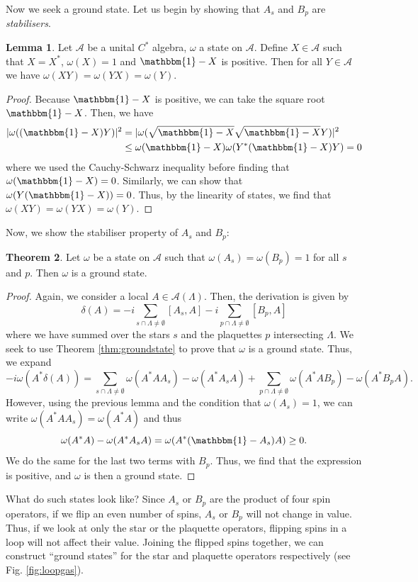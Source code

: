\documentclass[prb,11pt, nofootinbib]{revtex4-2}
\theoremstyle{definition}
\newtheorem{Theorem}{Theorem}
\newtheorem{Lemma}[Theorem]{Lemma}
\theoremstyle{definition}
\theoremstyle{definition}
\theoremstyle{definition}
\newcommand{\note}[1]{{\color{red} {#1}}}
\renewcommand{\note}[1]{{}}
\begin{document}
Now we seek a ground state. Let us begin by showing that $A_s$ and $B_p$ are \emph{stabilisers}.
\begin{Lemma}
	Let $\mathcal{A}$ be a unital $C^*$ algebra,  $\omega$ a state on $\mathcal{A}$. Define $X\in \mathcal{A}$ such that $X=X^*$, $\omega(X)=1$ and $\mathbbm{1}-X$ is positive. Then for all $Y\in \mathcal{A}$ we have $\omega(XY)=\omega(YX)=\omega(Y)$.
\end{Lemma}
\begin{proof}
	Because $\mathbbm{1}-X$ is positive, we can take the square root $\mathbbm{1}-X$. Then, we have
	\begin{align*}
		|\omega( (\mathbbm{1}-X)Y)|^2 &= |\omega(\sqrt{\mathbbm{1}-X}\sqrt{\mathbbm{1}-X}Y)|^2  \\ 
		&\le \omega(\mathbbm{1}-X)\omega(Y^* (\mathbbm{1}-X)Y)=0 
	\end{align*}
	\note{The last equality follows from linearity, and thus $\omega(\mathbbm{1}-X)=0$. Write down the fact that $\omega( (\mathbbm{1}-X)Y)=0$ }where we used the Cauchy-Schwarz inequality\note{ $|\omega(A^*B)|^2 \le \omega(A^*A)\omega(B^*B)$} before finding that $\omega(\mathbbm{1}-X)=0$. Similarly, we can show that $\omega(Y(\mathbbm{1}-X))=0$. Thus, by the linearity of states, we find that $\omega(XY)=\omega(YX)=\omega(Y)$. 
\end{proof}
Now, we show the stabiliser property of $A_s$ and $B_p$:
\begin{Theorem}
Let $\omega$ be a state on $\mathcal{A}$ such that $\omega(A_s)=\omega(B_p)=1$ for all $s$ and $p$. Then $\omega$ is a ground state.
\end{Theorem}
\begin{proof}
	Again, we consider a local $A\in \mathcal{A}(\Lambda)$. Then, the derivation is given by
	\[
	\delta(A) = -i \sum_{s\cap \Lambda \neq \emptyset} [A_s, A] - i \sum_{p\cap \Lambda\neq\emptyset} [B_p, A]
	\] 
	where we have summed over the stars $s$ and the plaquettes $p$ intersecting $\Lambda$. We seek to use Theorem \ref{thm:groundstate} to prove that $\omega$ is a ground state. Thus, we expand\note{ Note that $\mathbbm{1}-A_s$ is positive because $A_s$ is a projector}
	\[
	-i\omega(A^*\delta(A))=\sum_{s\cap\Lambda\neq\emptyset} \omega(A^*A A_s)-\omega(A^*A_sA)+\sum_{p\cap\Lambda\neq\emptyset}\omega(A^*AB_p)-\omega(A^*B_pA)
	.\] 
	However, using the previous lemma and the condition that $\omega(A_s)=1$, we can write $\omega(A^*A A_s)=\omega(A^* A)$ and thus
	\[
	\omega(A^*A)-\omega(A^* A_s A)=\omega(A^* (\mathbbm{1}-A_s)A)\ge 0
	.\] 
	We do the same for the last two terms with $B_p$. Thus, we find that the expression is positive, and $\omega$ is then a ground state.
\end{proof}
What do such states look like? Since $A_s$ or $B_p$ are the product of four spin operators, if we flip an even number of spins, $A_s$ or $B_p$ will not change in value. Thus, if we look at only the star or the plaquette operators, flipping spins in a loop will not affect their value. Joining the flipped spins together, we can construct ``ground states'' for the star and plaquette operators respectively (see Fig. \ref{fig:loopgas}).
\end{document}
